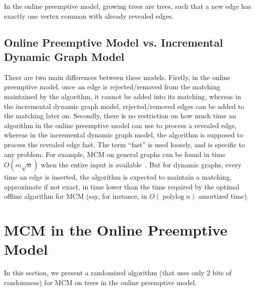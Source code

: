 \documentclass[11pt]{article}
\DeclareMathOperator{\polylog}{polylog}
\begin{document}
In the online preemptive model, growing trees are trees, such that a new edge has exactly one vertex common with already revealed edges.%

\subsection{Online Preemptive Model vs. Incremental Dynamic Graph Model}\label{comp}
There are two main differences between these models. Firstly, in the online preemptive model, once an edge is rejected/removed from the matching maintained by the algorithm, it cannot be added into its matching, whereas in the incremental dynamic graph model, rejected/removed edges can be added to the matching later on. Secondly, there is no restriction on how much time an algorithm in the online preemptive model can use to process a revealed edge, whereas in the incremental dynamic graph model, the algorithm is supposed to process the revealed edge fast. The term ``fast'' is used loosely, and is specific to any problem. For example, MCM on general graphs can be found in time $O(m\sqrt{n})$ when the entire input is available~\cite{micali}. But for dynamic graphs, every time an edge is inserted, the algorithm is expected to maintain a matching, approximate if not exact, in time lower than the time required by the optimal offline algorithm for  MCM (say, for instance, in $O(\polylog n)$ amortized time).

\section{MCM in the Online Preemptive Model}\label{rand_tree}
In this section, we present a randomized algorithm (that uses only $2$ bits of randomness) for MCM on trees in the online preemptive model.
\end{document}
